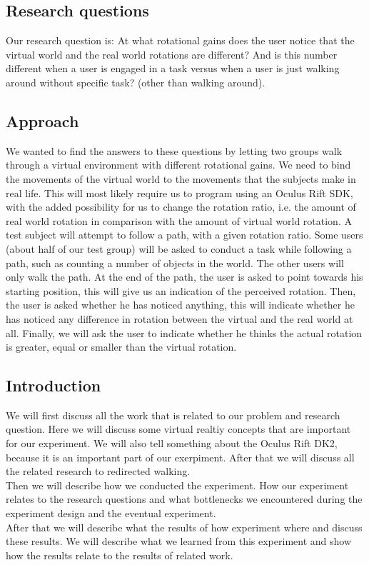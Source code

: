 \subsection{Research questions}\label{sec:questions}
Our research question is: At what rotational gains does the user notice that the virtual world and the real world rotations are different? And is this number different when a user is engaged in a task versus when a user is just walking around without specific task? (other than walking around).

\subsection{Approach}\label{sec:approach}
We wanted to find the answers to these questions by letting two groups walk through a virtual environment with different rotational gains. We need to bind the movements of the virtual world to the movements that the subjects make in real life.
This will most likely require us to program using an Oculus Rift SDK, with the added possibility for us to change the rotation ratio, i.e. the amount of real world rotation in comparison with the amount of virtual world rotation.
A test subject will attempt to follow a path, with a given rotation ratio.
Some users (about half of our test group) will be asked to conduct a task while following a path, such as counting a number of objects in the world. The other users will only walk the path. At the end of the path, the user is asked to point towards his starting position, this will give us an indication of the perceived rotation. Then, the user is asked whether he has noticed anything, this will indicate whether he has noticed any difference in rotation between the virtual and the real world at all. Finally, we will ask the user to indicate whether he thinks the actual rotation is greater, equal or smaller than the virtual rotation.

\subsection{Introduction}\label{sec:intro}
We will first discuss all the work that is related to our problem and research question. Here we will discuss some virtual realtiy concepts that are important for our experiment. We will also tell something about the Oculus Rift DK2, because it is an important part of our exerpiment. After that we will discuss all the related  research to redirected walking. \\
Then we will describe how we conducted the experiment. How our experiment relates to the research questions and  what bottlenecks we encountered during the experiment design and the eventual experiment. \\
After that we will describe what the results of how experiment where and discuss these results. We will describe what we learned from this experiment and show how the results relate to the results of related work. 